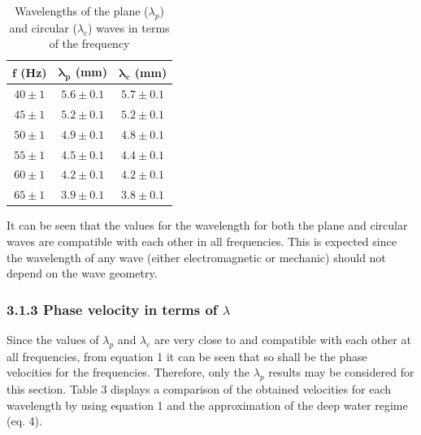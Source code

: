 \documentclass[a4paper, 12pt]{article}
\begin{document}
		\begin{table}[hbt!]
			\centering
			\begin{tabular}{|c|c|c|}
				\hline
					$\boldsymbol{f} $ \textbf{(Hz)} & $ \boldsymbol{\lambda_{p}} $ \textbf{(mm)} & $ \boldsymbol{\lambda_{c}} $ \textbf{(mm)} \\
				\hline
				\hline
				$40 \pm 1$ & $5.6 \pm 0.1$ & $5.7 \pm 0.1$ \\
				
				$45 \pm 1$ & $5.2 \pm 0.1$ & $5.2 \pm 0.1$\\
			
				$50 \pm 1$ & $4.9 \pm 0.1$ & $4.8 \pm 0.1$\\
				
				$55 \pm 1$ & $4.5 \pm 0.1$ & $4.4 \pm 0.1$\\
				
				$60 \pm 1$ & $4.2 \pm 0.1$ & $4.2 \pm 0.1$\\
			
				$65 \pm 1$ & $3.9 \pm 0.1$ & $3.8 \pm 0.1$\\
				\hline
				
			\end{tabular}
			\caption{Wavelengths of the plane ($\lambda_p$) and circular ($\lambda_c$) waves in terms of the frequency}
		\end{table}
		It can be seen that the values for the wavelength for both the plane and circular waves are compatible with each other in all frequencies. This is expected since the wavelength of any wave (either electromagnetic or mechanic) should not depend on the wave geometry. %
	\subsubsection{3.1.3 Phase velocity in terms of $\lambda$}
		Since the values of $\lambda_p$ and $\lambda_c$ are very close to and compatible with each other at all frequencies, from equation 1 it can be seen that so shall be the phase velocities for the frequencies. Therefore, only the $\lambda_p$ results may be considered for this section. Table 3 displays a comparison of the obtained velocities for each wavelength by using equation 1 and the approximation of the deep water regime (eq. 4). \\
		
\end{document}
